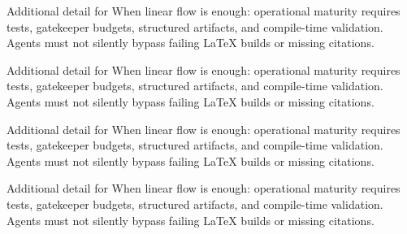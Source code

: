 Additional detail for When linear flow is enough: operational maturity requires tests, gatekeeper budgets, structured artifacts, and compile-time validation. Agents must not silently bypass failing LaTeX builds or missing citations. \cite{crewai2024} \cite{langgraph2024}

Additional detail for When linear flow is enough: operational maturity requires tests, gatekeeper budgets, structured artifacts, and compile-time validation. Agents must not silently bypass failing LaTeX builds or missing citations. \cite{crewai2024} \cite{langgraph2024}

Additional detail for When linear flow is enough: operational maturity requires tests, gatekeeper budgets, structured artifacts, and compile-time validation. Agents must not silently bypass failing LaTeX builds or missing citations. \cite{crewai2024} \cite{langgraph2024}

Additional detail for When linear flow is enough: operational maturity requires tests, gatekeeper budgets, structured artifacts, and compile-time validation. Agents must not silently bypass failing LaTeX builds or missing citations. \cite{crewai2024} \cite{langgraph2024}
